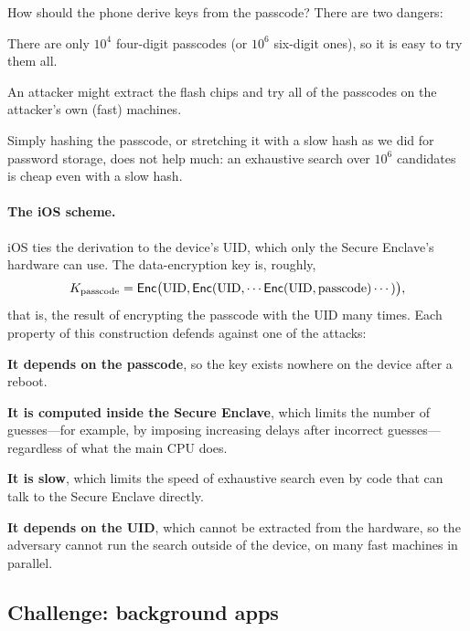 How should the phone derive keys from the passcode?
There are two dangers:
\begin{compactitem}
  \item There are only $10^4$ four-digit passcodes (or $10^6$ six-digit
        ones), so it is easy to try them all.
  \item An attacker might extract the flash chips and try all of the
        passcodes on the attacker's own (fast) machines.
\end{compactitem}
Simply hashing the passcode, or stretching it with a slow hash as we did
for password storage, does not help much: an exhaustive search over
$10^6$ candidates is cheap even with a slow hash.

\paragraph{The iOS scheme.}
iOS ties the derivation to the device's UID, which only the Secure
Enclave's hardware can use.
The data-encryption key is, roughly,
\[
  K_\text{passcode} = \mathsf{Enc}\bigl(\text{UID}, \mathsf{Enc}(\text{UID}, \cdots \mathsf{Enc}(\text{UID}, \text{passcode}) \cdots)\bigr),
\]
that is, the result of encrypting the passcode with the UID many times.
Each property of this construction defends against one of the attacks:
\begin{compactitem}
  \item \textbf{It depends on the passcode}, so the key exists nowhere on
        the device after a reboot.
  \item \textbf{It is computed inside the Secure Enclave}, which limits the
        number of guesses---for example, by imposing increasing delays
        after incorrect guesses---regardless of what the main CPU does.
  \item \textbf{It is slow}, which limits the speed of exhaustive search
        even by code that can talk to the Secure Enclave directly.
  \item \textbf{It depends on the UID}, which cannot be extracted from the
        hardware, so the adversary cannot run the search outside of the
        device, on many fast machines in parallel.
\end{compactitem}

\subsection{Challenge: background apps}

